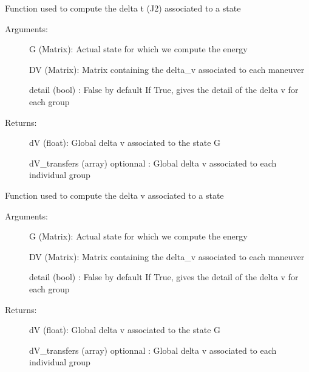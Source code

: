\documentclass[letterpaper,10pt,english]{sphinxmanual}
\begin{document}
\begin{fulllineitems}
\label{\detokenize{regroupement/optimizer:regroupement.optimizer.energy_computation.energy_computation_DT}}
Function used to compute the delta t (J2) associated to a state
\begin{description}
\item[{Arguments:}] \leavevmode
G (Matrix): Actual state for which we compute the energy

DV (Matrix): Matrix containing the delta\_v associated to each maneuver

detail (bool) : False by default \sphinxhyphen{} If True, gives the detail of the delta v for each group

\item[{Returns: }] \leavevmode
dV (float): Global delta v associated to the state G

dV\_transfers (array) \sphinxhyphen{} optionnal : Global delta v associated to each individual group

\end{description}

\end{fulllineitems}


\begin{fulllineitems}
\label{\detokenize{regroupement/optimizer:regroupement.optimizer.energy_computation.energy_computation_DV}}
Function used to compute the delta v associated to a state
\begin{description}
\item[{Arguments:}] \leavevmode
G (Matrix): Actual state for which we compute the energy

DV (Matrix): Matrix containing the delta\_v associated to each maneuver

detail (bool) : False by default \sphinxhyphen{} If True, gives the detail of the delta v for each group

\item[{Returns: }] \leavevmode
dV (float): Global delta v associated to the state G

dV\_transfers (array) \sphinxhyphen{} optionnal : Global delta v associated to each individual group

\end{description}

\end{fulllineitems}
\end{document}
